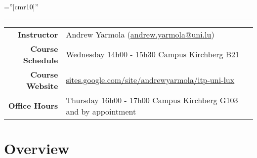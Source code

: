 \documentclass[a4paper,10pt]{article} %
\begin{document}
\pagestyle{empty} %

\font\fb=''[cmr10]'' %


\par{\par}
\rule{\textwidth}{0.4pt}
\begin{center}
\begin{tabular}{r|l}
\textbf{Instructor} & Andrew Yarmola (\href{mailto:andrew.yarmola@uni.lu}{andrew.yarmola@uni.lu})\\
\textbf{Course Schedule} & Wednesday 14h00 - 15h30 Campus Kirchberg B21\\
\textbf{Course Website} &\href{https://sites.google.com/site/andrewyarmola/itp-uni-lux}{sites.google.com/site/andrewyarmola/itp-uni-lux}\\
\textbf{Office Hours} & Thursday 16h00 - 17h00 Campus Kirchberg G103 and by appointment \\
\end{tabular}
\end{center}



\section{Overview}
\end{document}
